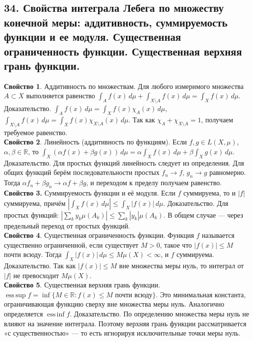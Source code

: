 \documentclass[12pt]{article}
\begin{document}
\subsection*{34. Свойства интеграла Лебега по множеству конечной меры: аддитивность,
суммируемость функции и ее модуля. Существенная ограниченность функции.
Существенная верхняя грань функции.}
\textbf{Свойство 1}. Аддитивность по множествам. Для любого измеримого множества $A \subset X$ выполняется равенство $\int_A f(x)\,d\mu + \int_{X\setminus A} f(x)\,d\mu = \int_X f(x)\,d\mu$. Доказательство. $\int_A f(x)\,d\mu = \int_X f(x)\chi_A(x)\,d\mu$, $\int_{X\setminus A} f(x)\,d\mu = \int_X f(x)\chi_{X\setminus A}(x)\,d\mu$. Так как $\chi_A + \chi_{X\setminus A} = 1$, получаем требуемое равенство. \\\textbf{Свойство 2}. Линейность (аддитивность по функциям). Если $f,g \in L(X,\mu)$, $\alpha,\beta \in \mathbb{R}$, то $\int_X (\alpha f(x)+\beta g(x))\,d\mu = \alpha \int_X f(x)\,d\mu + \beta \int_X g(x)\,d\mu$. Доказательство. Для простых функций линейность следует из определения. Для общих функций берём последовательности простых $f_n \to f$, $g_n \to g$ равномерно. Тогда $\alpha f_n + \beta g_n \to \alpha f + \beta g$, и переходом к пределу получаем равенство. \\\textbf{Свойство 3.} Суммируемость функции и её модуля. Если $f$ суммируема, то и $|f|$ суммируема, причём $\left|\int_X f(x)\,d\mu\right| \leq \int_X |f(x)|\,d\mu$. Доказательство. Для простых функций: $\left|\sum_k y_k \mu(A_k)\right| \leq \sum_k |y_k|\mu(A_k)$. В общем случае — через предельный переход от простых функций. \\\textbf{Свойство 4}. Существенная ограниченность функции. Функция $f$ называется существенно ограниченной, если существует $M>0$, такое что $|f(x)| \leq M$ почти всюду. Тогда $\int_X |f(x)|\,d\mu \leq M\mu(X) < \infty$, и $f$ суммируема. Доказательство. Так как $|f(x)| \leq M$ вне множества меры нуль, то интеграл от $|f|$ не превосходит $M\mu(X)$. \\\textbf{Свойство 5}. Существенная верхняя грань функции. $\operatorname{ess\,sup} f = \inf\{M \in \mathbb{R} : f(x) \leq M \text{ почти всюду}\}$. Это минимальная константа, ограничивающая функцию сверху вне множества меры нуль. Аналогично определяется $\operatorname{ess\,inf} f$. Доказательство. По определению множества меры нуль не влияют на значение интеграла. Поэтому верхняя грань функции рассматривается «с существенностью» — то есть игнорируя исключительные точки меры нуль.
\end{document}
